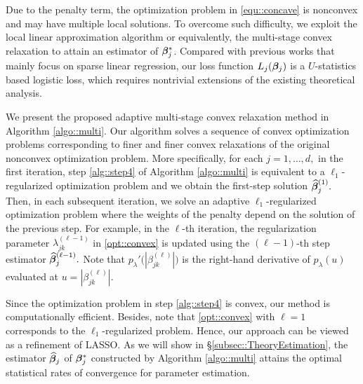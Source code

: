 \documentclass[twoside,11pt]{article}
\newcommand*{\hbbeta}{\hat{\bbeta}}
\begin{document}
Due to the penalty term, the optimization problem in  \eqref{equ::concave} is nonconvex and may have multiple local solutions. To overcome such difficulty, we exploit  the local linear approximation algorithm \citep{zou2008one,fan2014strong} or equivalently,  the  multi-stage convex relaxation \citep{zhang2010analysis,zhang2013multi, fan2018lamm} to attain an estimator of $\bm{\beta}_j^*$. Compared with  previous works that mainly focus on   sparse linear regression, our loss function ${L_j}(\bm{\beta}_j)$ is a $U$-statistics based logistic loss, which requires nontrivial extensions of the existing theoretical analysis.

 We present the proposed adaptive multi-stage convex relaxation method in Algorithm \ref{algo::multi}. Our algorithm solves a sequence of convex optimization problems corresponding to  finer and finer convex relaxations of the original nonconvex optimization problem. More specifically, for each $j = 1,\ldots,d,$ in the first iteration, step \ref{alg::step4} of Algorithm \ref{algo::multi}  is equivalent to a $\ell_1$-regularized optimization problem and we obtain the first-step solution $\hbbeta_j^{(1)}.$ Then, in each subsequent iteration, we solve an adaptive $\ell_1$-regularized optimization problem where  the weights of the penalty depend on the solution of the previous step. For example, in the $\ell$-th iteration, the regularization parameter $\!\lambda_{jk}^{( \ell-1)}$ in \eqref{opt::convex} is updated using the $(\ell- 1)$-th step estimator $\hbbeta_j^{(\ell-1)}.$  Note that  $ p_{\lambda}'\bigl(|\beta_{jk}^{(\ell)}|\bigr)$ is the right-hand derivative of $p_{\lambda}(u)$ evaluated at $u  =  |\beta_{jk}^{(\ell)}|$.

Since the optimization problem in step \ref{alg::step4} is convex, our method is computationally efficient. Besides, note that     \eqref{opt::convex} with  $\ell=1$ corresponds to the  $\ell_1$-regularized problem. Hence, our approach can be viewed as a refinement of LASSO.  As we will show in \S \ref{subsec::TheoryEstimation}, the estimator $\hbbeta_j$ of $\bm{\beta}_j^*$ constructed  by Algorithm \ref{algo::multi} attains the optimal statistical rates of convergence for parameter estimation.
\end{document}
